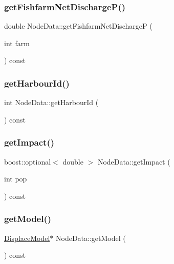 \subsubsection{\texorpdfstring{getFishfarmNetDischargeP()}{getFishfarmNetDischargeP()}}
{\footnotesize\ttfamily double Node\+Data\+::get\+Fishfarm\+Net\+DischargeP (\begin{DoxyParamCaption}\item[{int}]{farm }\end{DoxyParamCaption}) const\hspace{0.3cm}{\ttfamily [inline]}}

\mbox{\label{class_node_data_ae061a5d82a3dca53bf57702fa0c35d02}} 
\subsubsection{\texorpdfstring{getHarbourId()}{getHarbourId()}}
{\footnotesize\ttfamily int Node\+Data\+::get\+Harbour\+Id (\begin{DoxyParamCaption}{ }\end{DoxyParamCaption}) const}

\mbox{\label{class_node_data_a0c669fe7f991d0aaef02814c054b25c5}} 
\subsubsection{\texorpdfstring{getImpact()}{getImpact()}}
{\footnotesize\ttfamily boost\+::optional$<$ double $>$ Node\+Data\+::get\+Impact (\begin{DoxyParamCaption}\item[{int}]{pop }\end{DoxyParamCaption}) const}

\mbox{\label{class_node_data_a31b3b6b6111544d59918226d84ff2d88}} 
\subsubsection{\texorpdfstring{getModel()}{getModel()}}
{\footnotesize\ttfamily \mbox{\hyperlink{class_displace_model}{Displace\+Model}}$\ast$ Node\+Data\+::get\+Model (\begin{DoxyParamCaption}{ }\end{DoxyParamCaption}) const\hspace{0.3cm}{\ttfamily [inline]}}

